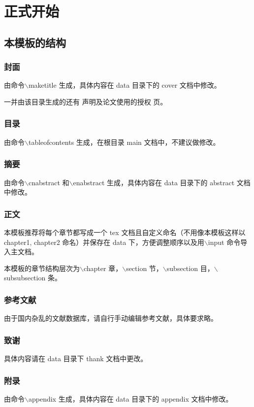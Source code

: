 \chapter{正式开始}
\section{本模板的结构}
\subsection{封面}
由命令$\backslash$maketitle 生成，具体内容在 data 目录下的 cover 文档中修改。

一并由该目录生成的还有 声明及论文使用的授权 页。

\subsection{目录}
由命令$\backslash$tableofcontents 生成，在根目录 main 文档中，不建议做修改。

\subsection{摘要}
由命令$\backslash$cnabstract 和$\backslash$enabstract 生成，具体内容在 data 目录下的 abstract 文档中修改。

\subsection{正文}
本模板推荐将每个章节都写成一个 tex 文档且自定义命名（不用像本模板这样以 chapter1, chapter2 命名）并保存在 data 下，方便调整顺序以及用$\backslash$input 命令导入主文档。

本模板的章节结构层次为$\backslash$chapter 章，$\backslash$section 节，$\backslash$subsection 目，$\backslash$subsubsection 条。

\subsection{参考文献}
由于国内杂乱的文献数据库，请自行手动编辑参考文献，具体要求略。

\subsection{致谢}
具体内容请在 data 目录下 thank 文档中更改。

\subsection{附录}
由命令$\backslash$appendix 生成，具体内容在 data 目录下的 appendix 文档中修改。


